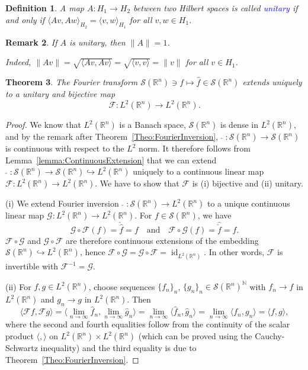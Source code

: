 \documentclass[12pt, oneside, a4paper]{article}
\newtheorem{thm}{Theorem}[section]
\def\id{\operatorname{id}}
\theoremstyle{dfn}
\newtheorem{dfn}[thm]{Definition}
\newtheorem{rem}[thm]{Remark}
\newcommand{\scalprod}[2]{\langle #1,#2 \rangle}
\def \S {\ensuremath{\mathcal{S}}}
\def \S {\ensuremath{\mathcal{S}}}
\def\Nbb{\mathbb{N}}
\def\Rbb{\ensuremath{\mathbb{R}}}
\providecommand{\norm}[1]{\lVert#1\rVert}
\newcommand{\Gcal}{\mathcal{G}}
\newcommand{\Fcal}{\mathcal{F}}
\begin{document}
\begin{dfn}
A map $A \colon H_1 \to H_2$ between two Hilbert spaces is called \textcolor{blue}{unitary} if and only if $\scalprod{Av}{Aw}_{H_2} = \scalprod{v}{w}_{H_1}$ for all $v, w \in H_1$.
\end{dfn}

\begin{rem}
If $A$ is unitary, then $\norm{A} = 1$.

Indeed, $\norm{Av} = \sqrt{\scalprod{Av}{Av}} = \sqrt{\scalprod{v}{v}} = \norm{v}$ for all $v \in H_1$.
\end{rem}

\begin{thm}\label{Theo:ExtensionOfFourierTransform}
The Fourier transform $\S(\Rbb^n) \ni f \mapsto \widehat{f} \in \S(\Rbb^n)$ extends uniquely to a unitary and bijective map
\[
\Fcal \colon L^2(\Rbb^n) \to L^2(\Rbb^n).
\]
\end{thm}

\begin{proof}
We know that $L^2(\Rbb^n)$ is a Banach space, $\S(\Rbb^n)$ is dense in $L^2(\Rbb^n)$, and by the remark after Theorem~\ref{Theo:FourierInversion}, $\;\widehat{}\; \colon \S(\Rbb^n) \to \S(\Rbb^n)$ is continuous with respect to the $L^2$ norm. It therefore follows from Lemma~\ref{lemma:ContinuousExtension} that we can extend $\;\widehat{}\; \colon \S(\Rbb^n) \to \S(\Rbb^n) \hookrightarrow L^2(\Rbb^n)$ uniquely to a continuous linear map $\Fcal \colon L^2(\Rbb^n) \to L^2(\Rbb^n)$. We have to show that $\Fcal$ is (i) bijective and (ii) unitary.

(i) We extend Fourier inversion $\;\check{}\; \colon \S(\Rbb^n) \to L^2(\Rbb^n)$ to a unique continuous linear map $\Gcal \colon L^2(\Rbb^n) \to L^2(\Rbb^n)$. For $f \in \S(\Rbb^n)$, we have
\[
\Gcal \circ \Fcal(f) = \check{\widehat{f}} = f
\quad\text{and} \quad
\Fcal \circ \Gcal(f) = \widehat{\check{f}} = f.
\]
$\Fcal \circ \Gcal$ and $\Gcal \circ \Fcal$ are therefore continuous extensions of the embedding $\S(\Rbb^n) \hookrightarrow L^2(\Rbb^n)$, hence $\Fcal \circ \Gcal = \Gcal \circ \Fcal = \id_{L^2(\Rbb^n)}$. In other words, $\Fcal$ is invertible with $\Fcal^{-1} = \Gcal$.

(ii) For $f,g \in L^2(\Rbb^n)$, choose sequences $\{f_n\}_n$, $\{g_n\}_n \in \S(\Rbb^n)^\Nbb$ with $f_n \to f$ in $L^2(\Rbb^n)$ and $g_n \to g$ in $L^2(\Rbb^n)$. Then
\[
\scalprod{\Fcal f}{\Fcal g}
= \scalprod{\lim_{n \to \infty} \widehat{f}_n}{\lim_{n \to \infty} \widehat{g}_n}
= \lim_{n \to \infty} \scalprod{\widehat{f}_n}{ \widehat{g}_n}
= \lim_{n \to \infty} \scalprod{f_n}{g_n}
= \scalprod{f}{g},
\]
where the second and fourth equalities follow from the continuity of the scalar product $\scalprod{}{}$ on $L^2(\Rbb^n) \times L^2(\Rbb^n)$ (which can be proved using the Cauchy-Schwartz inequality) and the third equality is due to Theorem~\ref{Theo:FourierInversion}.
\end{proof}
\end{document}
